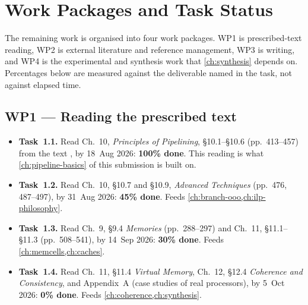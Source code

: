 \documentclass[11pt,a4paper]{report}
\begin{document}
\section{Work Packages and Task Status}
\label{sec:workpackages}

The remaining work is organised into four work packages. WP1 is
prescribed-text reading, WP2 is external literature and reference
management, WP3 is writing, and WP4 is the experimental and synthesis
work that \cref{ch:synthesis} depends on. Percentages below are measured
against the deliverable named in the task, not against elapsed time.

\subsection*{WP1 --- Reading the prescribed text}
\begin{itemize}[leftmargin=*]
  \item \textbf{Task~1.1.} Read Ch.~10, \emph{Principles of Pipelining},
    \S10.1--\S10.6 (pp.~413--457) from the text \cite{sarangi}, by
    18~Aug 2026: \textbf{100\% done}. This reading is what
    \cref{ch:pipeline-basics} of this submission is built on.
  \item \textbf{Task~1.2.} Read Ch.~10, \S10.7 and \S10.9,
    \emph{Advanced Techniques} (pp.~476, 487--497), by 31~Aug 2026:
    \textbf{45\% done}. Feeds \cref{ch:branch-ooo,ch:ilp-philosophy}.
  \item \textbf{Task~1.3.} Read Ch.~9, \S9.4 \emph{Memories}
    (pp.~288--297) and Ch.~11, \S11.1--\S11.3 (pp.~508--541), by
    14~Sep 2026: \textbf{30\% done}. Feeds
    \cref{ch:memcells,ch:caches}.
  \item \textbf{Task~1.4.} Read Ch.~11, \S11.4 \emph{Virtual Memory},
    Ch.~12, \S12.4 \emph{Coherence and Consistency}, and Appendix~A
    (case studies of real processors), by 5~Oct 2026:
    \textbf{0\% done}. Feeds \cref{ch:coherence,ch:synthesis}.
\end{itemize}
\end{document}
